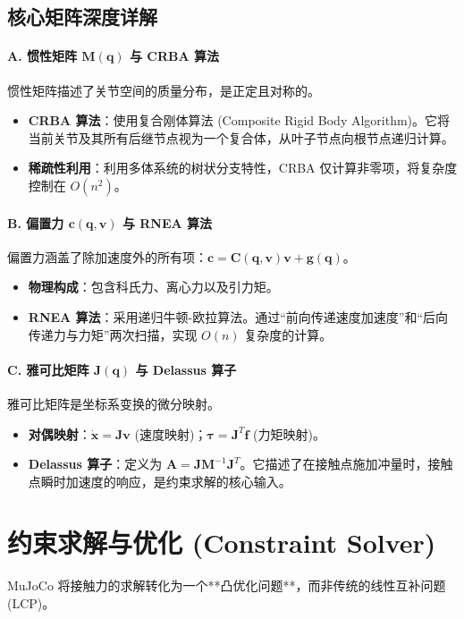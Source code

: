 \documentclass[11pt,a4paper]{book}
\begin{document}
\subsection{核心矩阵深度详解}

\paragraph{A. 惯性矩阵 $\bm{M}(\bm{q})$ 与 CRBA 算法} 
惯性矩阵描述了关节空间的质量分布，是正定且对称的。
\begin{itemize}
    \item \textbf{CRBA 算法}：使用复合刚体算法 (Composite Rigid Body Algorithm)。它将当前关节及其所有后继节点视为一个复合体，从叶子节点向根节点递归计算。
    \item \textbf{稀疏性利用}：利用多体系统的树状分支特性，CRBA 仅计算非零项，将复杂度控制在 $O(n^2)$。
\end{itemize}

\paragraph{B. 偏置力 $\bm{c}(\bm{q}, \bm{v})$ 与 RNEA 算法} 
偏置力涵盖了除加速度外的所有项：$\bm{c} = \bm{C}(\bm{q}, \bm{v})\bm{v} + \bm{g}(\bm{q})$。
\begin{itemize}
    \item \textbf{物理构成}：包含科氏力、离心力以及引力矩。
    \item \textbf{RNEA 算法}：采用递归牛顿-欧拉算法。通过“前向传递速度加速度”和“后向传递力与力矩”两次扫描，实现 $O(n)$ 复杂度的计算。
\end{itemize}

\paragraph{C. 雅可比矩阵 $\bm{J}(\bm{q})$ 与 Delassus 算子} 
雅可比矩阵是坐标系变换的微分映射。
\begin{itemize}
    \item \textbf{对偶映射}：$\dot{\bm{x}} = \bm{J}\bm{v}$ (速度映射)；$\bm{\tau} = \bm{J}^T \bm{f}$ (力矩映射)。
    \item \textbf{Delassus 算子}：定义为 $\bm{A} = \bm{J}\bm{M}^{-1}\bm{J}^T$。它描述了在接触点施加冲量时，接触点瞬时加速度的响应，是约束求解的核心输入。
\end{itemize}

\section{约束求解与优化 (Constraint Solver)}
MuJoCo 将接触力的求解转化为一个**凸优化问题**，而非传统的线性互补问题 (LCP)。
\end{document}
